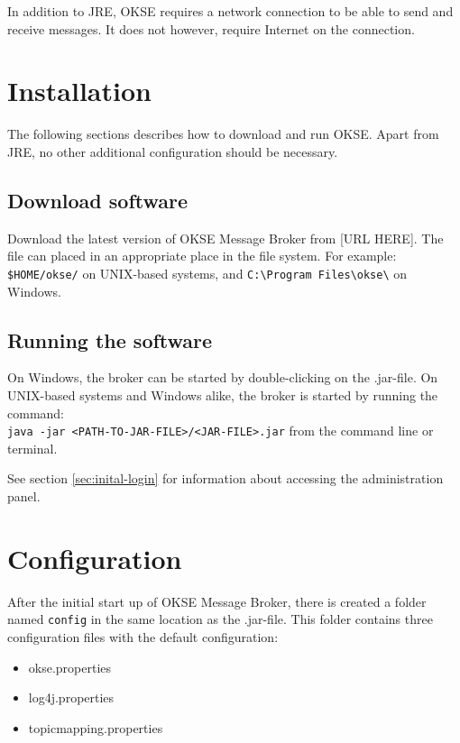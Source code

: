 In addition to JRE, OKSE requires a network connection to be able to send and receive messages. It does not however, require Internet on the connection. 

\section{Installation}

The following sections describes how to download and run OKSE. Apart from JRE, no other additional configuration should be necessary.

\subsection{Download software}

Download the latest version of OKSE Message Broker from [URL HERE].
The file can placed in an appropriate place in the file system. For example: \verb!$HOME/okse/! on UNIX-based systems, and \verb!C:\Program Files\okse\! on Windows.

\subsection{Running the software}

On Windows, the broker can be started by double-clicking on the .jar-file. On UNIX-based systems and Windows alike, the broker is started by running the command: \\ \verb!java -jar <PATH-TO-JAR-FILE>/<JAR-FILE>.jar! from the command line or terminal.

See section \ref{sec:inital-login} for information about accessing the administration panel.

\section{Configuration}

After the initial start up of OKSE Message Broker, there is created a folder named \verb!config! in the same location as the .jar-file. This folder contains three configuration files with the default configuration:

\begin{itemize}
\setlength{\itemsep}{0cm}%
\item okse.properties
\item log4j.properties
\item topicmapping.properties
\end{itemize}


